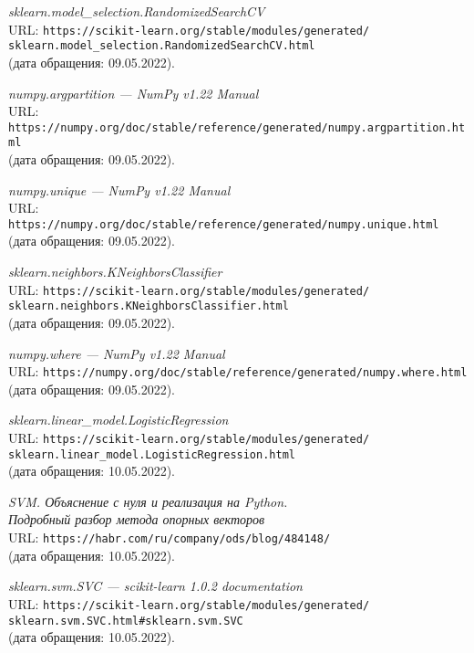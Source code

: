 \begin{thebibliography}{99}
{\itshape sklearn.model\_selection.RandomizedSearchCV}\\
URL: \texttt{https://scikit-learn.org/stable/modules/generated/\\sklearn.model\_selection.RandomizedSearchCV.html}\\
(дата обращения: 09.05.2022).

{\itshape numpy.argpartition --- NumPy v1.22 Manual}\\
URL: \texttt{https://numpy.org/doc/stable/reference/generated/numpy.argpartition.html}\\
(дата обращения: 09.05.2022).

{\itshape numpy.unique --- NumPy v1.22 Manual}\\
URL: \texttt{https://numpy.org/doc/stable/reference/generated/numpy.unique.html}\\
(дата обращения: 09.05.2022).

{\itshape sklearn.neighbors.KNeighborsClassifier}\\
URL: \texttt{https://scikit-learn.org/stable/modules/generated/\\sklearn.neighbors.KNeighborsClassifier.html}\\
(дата обращения: 09.05.2022).

{\itshape numpy.where --- NumPy v1.22 Manual}\\
URL: \texttt{https://numpy.org/doc/stable/reference/generated/numpy.where.html}\\
(дата обращения: 09.05.2022).

{\itshape sklearn.linear\_model.LogisticRegression}\\
URL: \texttt{https://scikit-learn.org/stable/modules/generated/\\sklearn.linear\_model.LogisticRegression.html}\\
(дата обращения: 10.05.2022).

{\itshape SVM. Объяснение с нуля и реализация на Python.\\Подробный разбор метода опорных векторов}\\
URL: \texttt{https://habr.com/ru/company/ods/blog/484148/}\\
(дата обращения: 10.05.2022).

{\itshape sklearn.svm.SVC --- scikit-learn 1.0.2 documentation}\\
URL: \texttt{https://scikit-learn.org/stable/modules/generated/\\sklearn.svm.SVC.html\#sklearn.svm.SVC}\\
(дата обращения: 10.05.2022).


\end{thebibliography}
